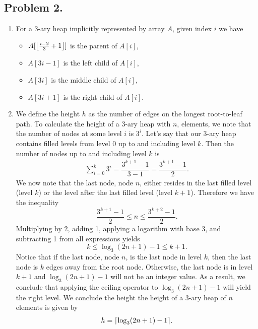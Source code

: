 \documentclass[11pt, letterpaper, titlepage]{article}
\DeclarePairedDelimiter\ceil{\lceil}{\rceil}
\DeclarePairedDelimiter\floor{\lfloor}{\rfloor}
\begin{document}
\newpage
\subsection*{Problem 2.}
\begin{enumerate}[label=\alph*)]
    \item For a 3-ary heap implicitly represented by array $A$, given index $i$ we have
    \begin{itemize}
        \item $A[ \floor*{\frac{i - 2}{3} + 1} ]$ is the parent of $A[i]$,
        \item $A[ 3i - 1 ]$ is the left child of $A[i]$,
        \item $A[ 3i ]$ is the middle child of $A[i]$,
        \item $A[ 3i + 1 ]$ is the right child of $A[i]$.
    \end{itemize}

    \item We define the height $h$ as the number of edges on the longest root-to-leaf path. To calculate the height of a 3-ary heap with $n$, elements, we note that the number of nodes at some level $i$ is $3^i$. Let's say that our 3-ary heap contains filled levels from level 0 up to and including level $k$. Then the number of nodes up to and including level $k$ is
    \begin{align}
        \sum_{i = 0}^k 3^i = \dfrac{3^{k + 1} - 1}{3 - 1} = \dfrac{3^{k + 1} - 1}{2}.
    \end{align}
    We now note that the last node, node $n$, either resides in the last filled level (level $k$) or the level after the last filled level (level $k + 1$). Therefore we have the inequality
    \begin{equation}
        \dfrac{3^{k + 1} - 1}{2} \leq n \leq \dfrac{3^{k + 2} - 1}{2}.
    \end{equation}
    Multiplying by 2, adding 1, applying a logarithm with base 3, and subtracting 1 from all expressions yields
    \begin{equation}
        k \leq \log_3(2n + 1) -1 \leq k + 1.
    \end{equation}
    Notice that if the last node, node $n$, is the last node in level $k$, then the last node is $k$ edges away from the root node. Otherwise, the last node is in level $k + 1$ and $\log_3(2n + 1) - 1$ will not be an integer value. As a result, we conclude that applying the ceiling operator to $\log_3(2n + 1) - 1$ will yield the right level. We conclude the height the height of a 3-ary heap of $n$ elements is given by 
    \begin{align}
        h = \ceil*{\log_3(2n + 1) - 1}.
    \end{align}


\end{enumerate}
\end{document}
